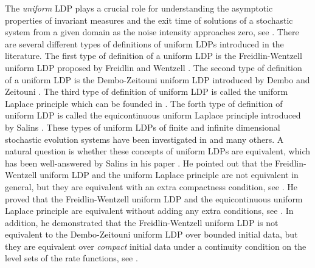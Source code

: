 \documentclass[11pt]{article}
\numberwithin{equation}{section}
\begin{document}
The \emph{uniform} LDP plays a
crucial role
for understanding
the  asymptotic properties of invariant measures
  and the  exit time  of solutions   of a stochastic system   from a
  given  domain  as the noise intensity approaches zero, see \cite{Biswasa,Chenal1,Dembo,Freidlin,Martinelli1}.
  There are several different types of definitions of
  uniform LDPs  introduced
  in the literature.
  The first type of  definition of a uniform LDP is the Freidlin-Wentzell uniform LDP proposed by
Freidlin and Wentzell \cite{Freidlin}.
The second type of definition of a uniform LDP is
the Dembo-Zeitouni uniform LDP introduced by Dembo and Zeitouni \cite{Dembo}. The third type of definition of uniform LDP is called the uniform Laplace principle which can be founded in \cite{Budhiraja1,Dupuis-}. The forth  type of definition of uniform LDP is called the equicontinuous uniform Laplace principle introduced by Salins \cite{Salins2}. These types of uniform LDPs of finite and infinite dimensional stochastic evolution systems have been investigated in \cite{Budhiraja1,Gautier,Salins1, Sowers1}
 and many others. A natural question is   whether these
 concepts  of uniform LDPs are equivalent,
 which   has been
well-answered by Salins in his
paper \cite{Salins2}. He pointed out that the Freidlin-Wentzell uniform LDP and the uniform Laplace principle are not
equivalent in general, but they are equivalent
with an extra compactness condition, see \cite[Theorem 2.5]{Salins2}. He proved that the Freidlin-Wentzell uniform LDP and the equicontinuous uniform Laplace principle are equivalent
without adding any extra conditions, see \cite[Theorem 2.9]{Salins2}. In addition, he demonstrated that the Freidlin-Wentzell uniform LDP is not equivalent to the Dembo-Zeitouni uniform LDP over bounded initial data, but they are equivalent over \emph{compact} initial data under a continuity condition on the level sets of the rate functions, see \cite[Theorem 2.9]{Salins2}.
\end{document}
